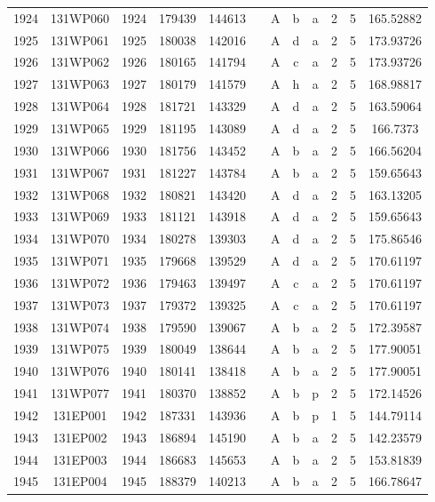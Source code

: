 \begin{tabular}{|*{12}{c|}}
1924 & 131WP060 & 1924 & 179439 & 144613 &  & A & b & a & 2 & 5 & 165.52882 \\ 
1925 & 131WP061 & 1925 & 180038 & 142016 &  & A & d & a & 2 & 5 & 173.93726 \\ 
1926 & 131WP062 & 1926 & 180165 & 141794 &  & A & c & a & 2 & 5 & 173.93726 \\ 
1927 & 131WP063 & 1927 & 180179 & 141579 &  & A & h & a & 2 & 5 & 168.98817 \\ 
1928 & 131WP064 & 1928 & 181721 & 143329 &  & A & d & a & 2 & 5 & 163.59064 \\ 
1929 & 131WP065 & 1929 & 181195 & 143089 &  & A & d & a & 2 & 5 & 166.7373 \\ 
1930 & 131WP066 & 1930 & 181756 & 143452 &  & A & b & a & 2 & 5 & 166.56204 \\ 
1931 & 131WP067 & 1931 & 181227 & 143784 &  & A & b & a & 2 & 5 & 159.65643 \\ 
1932 & 131WP068 & 1932 & 180821 & 143420 &  & A & d & a & 2 & 5 & 163.13205 \\ 
1933 & 131WP069 & 1933 & 181121 & 143918 &  & A & d & a & 2 & 5 & 159.65643 \\ 
1934 & 131WP070 & 1934 & 180278 & 139303 &  & A & d & a & 2 & 5 & 175.86546 \\ 
1935 & 131WP071 & 1935 & 179668 & 139529 &  & A & d & a & 2 & 5 & 170.61197 \\ 
1936 & 131WP072 & 1936 & 179463 & 139497 &  & A & c & a & 2 & 5 & 170.61197 \\ 
1937 & 131WP073 & 1937 & 179372 & 139325 &  & A & c & a & 2 & 5 & 170.61197 \\ 
1938 & 131WP074 & 1938 & 179590 & 139067 &  & A & b & a & 2 & 5 & 172.39587 \\ 
1939 & 131WP075 & 1939 & 180049 & 138644 &  & A & b & a & 2 & 5 & 177.90051 \\ 
1940 & 131WP076 & 1940 & 180141 & 138418 &  & A & b & a & 2 & 5 & 177.90051 \\ 
1941 & 131WP077 & 1941 & 180370 & 138852 &  & A & b & p & 2 & 5 & 172.14526 \\ 
1942 & 131EP001 & 1942 & 187331 & 143936 &  & A & b & p & 1 & 5 & 144.79114 \\ 
1943 & 131EP002 & 1943 & 186894 & 145190 &  & A & b & a & 2 & 5 & 142.23579 \\ 
1944 & 131EP003 & 1944 & 186683 & 145653 &  & A & b & a & 2 & 5 & 153.81839 \\ 
1945 & 131EP004 & 1945 & 188379 & 140213 &  & A & b & a & 2 & 5 & 166.78647 \\ 

\end{tabular}
